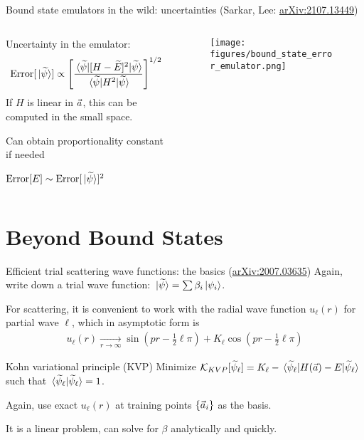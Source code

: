 \documentclass[xcolor=dvipsnames, aspectratio=169]{beamer}
\begin{document}
\begin{frame}{Bound state emulators in the wild: uncertainties (\alert{Sarkar, Lee: \href{https://arxiv.org/abs/2107.13449}{arXiv:2107.13449}})}
\begin{columns}[t]
\begin{column}{0.5\textwidth}
Uncertainty in the emulator:
\begin{align*}
\textup{Error}[\ket*{\widetilde{\psi}}] \propto \left[\frac{\mel*{\widetilde{\psi}}{[H - \widetilde{E}]^2}{\widetilde{\psi}}}{\mel*{\widetilde{\psi}}{H^2}{\widetilde{\psi}}}\right]^{1/2}
\end{align*}
If $H$ is linear in $\vec{a}$, this can be computed in the small space.

\vspace{0.2cm}
Can obtain proportionality constant if needed

\vspace{0.2cm}
$\textup{Error}[E] \sim \textup{Error}[\ket*{\widetilde{\psi}}]^2$
\end{column}
\begin{column}{0.5\textwidth}
\begin{figure}
\vspace{-0.4cm}
\texttt{[image: figures/bound\_state\_error\_emulator.png]}
\end{figure}
\end{column}
\end{columns}
\end{frame}


\section{Beyond Bound States}

\begin{frame}[t]{Efficient trial scattering wave functions: the basics (\alert{\href{https://arxiv.org/abs/2007.03635}{arXiv:2007.03635}})}
Again, write down a \alert{trial wave function}: $\ket*{\widetilde{\psi}} = \sum \beta_i \ket*{\psi_i}$.

For scattering, it is convenient to work with the radial wave function $u_\ell(r)$ for partial wave $\ell$, which in asymptotic form is
\begin{align*}
    u_\ell(r) \xrightarrow[r\to\infty]{} \sin(pr - \frac{1}{2}\ell\pi) + K_\ell \cos(pr - \frac{1}{2}\ell\pi)
\end{align*}

\begin{myblock}[valign=center]{Kohn variational principle (KVP)}
Minimize $\mathcal{K}_{KVP}[\widetilde{\psi}_\ell] = K_\ell - \mel*{\widetilde{\psi}_\ell}{H(\vec{a}) - E}{\widetilde{\psi}_\ell}$ such that $\braket*{\widetilde{\psi}_\ell}{\widetilde{\psi}_\ell} = 1$.
\end{myblock}%

Again, use exact $u_\ell(r)$ at training points $\{\vec{a}_i\}$ as the basis.

It is a linear problem, can solve for $\beta$ analytically and quickly.
\end{frame}
\end{document}
